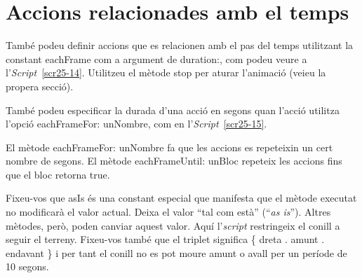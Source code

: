 \section{Accions relacionades amb el temps}
També podeu definir accions que es relacionen amb el pas del temps utilitzant la constant \textsf{eachFrame} com a argument de \textsf{duration:}, com podeu veure a l'\emph{Script}~\ref{scr25-14}. Utilitzeu el mètode \textsf{stop} per aturar l'animació (veieu la propera secció).

També podeu especificar la durada d'una acció en segons quan l'acció utilitza l'opció \textsf{eachFrameFor: unNombre}, com en l'\emph{Script}~\ref{scr25-15}.  

El mètode \textsf{eachFrameFor: unNombre} fa que les accions es repeteixin un cert nombre de segons. El mètode \textsf{eachFrameUntil: unBloc} repeteix les accions fins que el bloc retorna \textsf{true}. 

Fixeu-vos que \textsf{asIs} és una constant especial que manifesta que el mètode executat no modificarà el valor actual. Deixa el valor ``tal com està'' (``\emph{as is}''). Altres mètodes, però, poden canviar aquest valor. Aquí l'\emph{script} restringeix el conill a seguir el terreny. Fixeu-vos també que el triplet significa \textsf{\{ dreta . amunt . endavant \}} i per tant el conill no es pot moure amunt o avall per un període de 10 segons.

